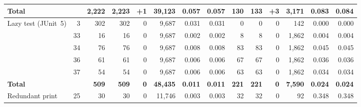 \begin{xltabular}{\linewidth}{l r r r r r r r r r r r r r}
    \textbf{Total} & & \textbf{2,222} & \textbf{2,223} & \textbf{+1} & \textbf{39,123} & \textbf{0.057} & \textbf{0.057} & \textbf{130} & \textbf{133} & \textbf{+3} & \textbf{3,171} & \textbf{0.083} & \textbf{0.084} \\
  \midrule
    \textcolor{muted}{Lazy test (JUnit~5)} & \textcolor{muted}{3} & \textcolor{muted}{302} & \textcolor{muted}{302} & \textcolor{muted}{0} & \textcolor{muted}{9,687} & \textcolor{muted}{0.031} & \textcolor{muted}{0.031} & \textcolor{muted}{0} & \textcolor{muted}{0} & \textcolor{muted}{0} & \textcolor{muted}{142} & \textcolor{muted}{0.000} & \textcolor{muted}{0.000} \\
     & \textcolor{muted}{33} & \textcolor{muted}{16} & \textcolor{muted}{16} & \textcolor{muted}{0} & \textcolor{muted}{9,687} & \textcolor{muted}{0.002} & \textcolor{muted}{0.002} & \textcolor{muted}{8} & \textcolor{muted}{8} & \textcolor{muted}{0} & \textcolor{muted}{1,862} & \textcolor{muted}{0.004} & \textcolor{muted}{0.004} \\
     & \textcolor{muted}{34} & \textcolor{muted}{76} & \textcolor{muted}{76} & \textcolor{muted}{0} & \textcolor{muted}{9,687} & \textcolor{muted}{0.008} & \textcolor{muted}{0.008} & \textcolor{muted}{83} & \textcolor{muted}{83} & \textcolor{muted}{0} & \textcolor{muted}{1,862} & \textcolor{muted}{0.045} & \textcolor{muted}{0.045} \\
     & \textcolor{muted}{36} & \textcolor{muted}{61} & \textcolor{muted}{61} & \textcolor{muted}{0} & \textcolor{muted}{9,687} & \textcolor{muted}{0.006} & \textcolor{muted}{0.006} & \textcolor{muted}{67} & \textcolor{muted}{67} & \textcolor{muted}{0} & \textcolor{muted}{1,862} & \textcolor{muted}{0.036} & \textcolor{muted}{0.036} \\
     & \textcolor{muted}{37} & \textcolor{muted}{54} & \textcolor{muted}{54} & \textcolor{muted}{0} & \textcolor{muted}{9,687} & \textcolor{muted}{0.006} & \textcolor{muted}{0.006} & \textcolor{muted}{63} & \textcolor{muted}{63} & \textcolor{muted}{0} & \textcolor{muted}{1,862} & \textcolor{muted}{0.034} & \textcolor{muted}{0.034} \\
    \textbf{Total} & & \textbf{509} & \textbf{509} & \textbf{0} & \textbf{48,435} & \textbf{0.011} & \textbf{0.011} & \textbf{221} & \textbf{221} & \textbf{0} & \textbf{7,590} & \textbf{0.024} & \textbf{0.024} \\
  \midrule
    \textcolor{muted}{Redundant print} & \textcolor{muted}{25} & \textcolor{muted}{30} & \textcolor{muted}{30} & \textcolor{muted}{0} & \textcolor{muted}{11,746} & \textcolor{muted}{0.003} & \textcolor{muted}{0.003} & \textcolor{muted}{32} & \textcolor{muted}{32} & \textcolor{muted}{0} & \textcolor{muted}{92} & \textcolor{muted}{0.348} & \textcolor{muted}{0.348} \\

\end{xltabular}
